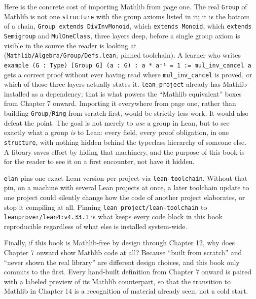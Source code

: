 Here is the concrete cost of importing Mathlib from page one. The real \texttt{Group} of Mathlib is not one \texttt{structure} with the group axioms listed in it; it is the bottom of a chain, \texttt{Group extends DivInvMonoid}, which \texttt{extends Monoid}, which \texttt{extends Semigroup} and \texttt{MulOneClass}, three layers deep, before a single group axiom is visible in the source the reader is looking at (\texttt{Mathlib/\allowbreak{}Algebra/\allowbreak{}Group/\allowbreak{}Defs.lean}, pinned toolchain). A learner who writes \texttt{example (G : Type) [Group G] (a : G) : a * a⁻¹ = 1 := mul\_\allowbreak{}inv\_\allowbreak{}cancel a} gets a correct proof without ever having read where \texttt{mul\_\allowbreak{}inv\_\allowbreak{}cancel} is proved, or which of those three layers actually states it. \texttt{lean\_\allowbreak{}project} already has Mathlib installed as a dependency; that is what powers the ``Mathlib equivalent'' boxes from Chapter 7 onward. Importing it everywhere from page one, rather than building \texttt{Group}/\texttt{Ring} from scratch first, would be strictly less work. It would also defeat the point. The goal is not merely to \emph{use} a group in Lean, but to see exactly what a group \emph{is} to Lean: every field, every proof obligation, in one \texttt{structure}, with nothing hidden behind the typeclass hierarchy of someone else. A library saves effort by hiding that machinery, and the purpose of this book is for the reader to see it on a first encounter, not have it hidden.

\texttt{elan} pins one exact Lean version per project via \texttt{lean-\allowbreak{}toolchain}. Without that pin, on a machine with several Lean projects at once, a later toolchain update to one project could silently change how the code of another project elaborates, or stop it compiling at all. Pinning \texttt{lean\_\allowbreak{}project/\allowbreak{}lean-\allowbreak{}toolchain} to \texttt{leanprover/\allowbreak{}lean4:v4.33.1} is what keeps every code block in this book reproducible regardless of what else is installed system-wide.

Finally, if this book is Mathlib-free by design through Chapter 12, why does Chapter 7 onward show Mathlib code at all? Because ``built from scratch'' and ``never shown the real library'' are different design choices, and this book only commits to the first. Every hand-built definition from Chapter 7 onward is paired with a labeled preview of its Mathlib counterpart, so that the transition to Mathlib in Chapter 14 is a recognition of material already seen, not a cold start.

